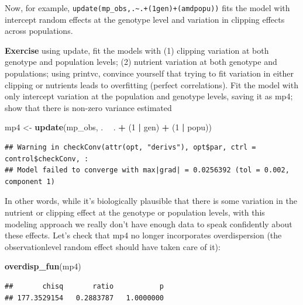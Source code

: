 \documentclass[
  12pt,
]{book}
\newenvironment{Shaded}{\begin{snugshade}}{\end{snugshade}}
\newcommand{\DecValTok}[1]{\textcolor[rgb]{0.00,0.00,0.81}{#1}}
\newcommand{\KeywordTok}[1]{\textcolor[rgb]{0.13,0.29,0.53}{\textbf{#1}}}
\newcommand{\NormalTok}[1]{#1}
\newcommand{\OperatorTok}[1]{\textcolor[rgb]{0.81,0.36,0.00}{\textbf{#1}}}
\newcommand{\StringTok}[1]{\textcolor[rgb]{0.31,0.60,0.02}{#1}}
\begin{document}
Now, for example, \texttt{update(mp\_obs,.\textasciitilde{}.+(1\textbar{}gen)+(amd\textbar{}popu))} fits the model with intercept random effects at the genotype level and variation in clipping effects across populations.

\textbf{Exercise} using update, fit the models with (1) clipping variation at both genotype and population levels; (2) nutrient variation at both genotype and populations; using printvc, convince yourself that trying to fit variation in either clipping or nutrients leads to overfitting (perfect correlations). Fit the model with only intercept variation at the population and genotype levels, saving it as mp4; show that there is non-zero variance estimated

\begin{Shaded}
\begin{Highlighting}[]
\NormalTok{mp4 <-}\StringTok{ }\KeywordTok{update}\NormalTok{(mp_obs, . }\OperatorTok{~}\StringTok{ }\NormalTok{. }\OperatorTok{+}\StringTok{ }\NormalTok{(}\DecValTok{1} \OperatorTok{|}\StringTok{ }\NormalTok{gen) }\OperatorTok{+}\StringTok{ }\NormalTok{(}\DecValTok{1} \OperatorTok{|}\StringTok{ }\NormalTok{popu))}
\end{Highlighting}
\end{Shaded}

\begin{verbatim}
## Warning in checkConv(attr(opt, "derivs"), opt$par, ctrl = control$checkConv, :
## Model failed to converge with max|grad| = 0.0256392 (tol = 0.002, component 1)
\end{verbatim}

In other words, while it's biologically plausible that there is some variation in the nutrient or clipping effect at the genotype or population levels,
with this modeling approach we really don't have enough data to speak
confidently about these effects.
Let's check that mp4 no longer incorporates overdispersion (the observationlevel random effect should have taken care of it):

\begin{Shaded}
\begin{Highlighting}[]
\KeywordTok{overdisp_fun}\NormalTok{(mp4)}
\end{Highlighting}
\end{Shaded}

\begin{verbatim}
##       chisq       ratio           p 
## 177.3529154   0.2883787   1.0000000
\end{verbatim}
\end{document}
